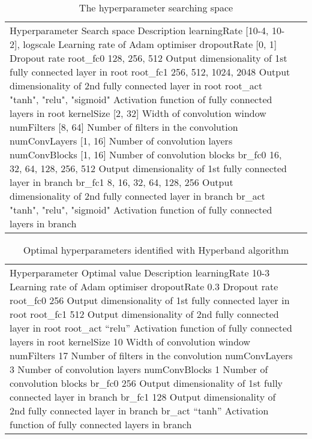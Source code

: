 \begin{table}[h]
    \centering
    \begin{tabular}{lr}
      \hline
      Hyperparameter	Search space	Description
      \hline
      learningRate	[10-4, 10-2], logscale	Learning rate of Adam optimiser
      dropoutRate	[0, 1]	Dropout rate
      root_fc0	128, 256, 512	Output dimensionality of 1st fully connected layer in root
      root_fc1	256, 512, 1024, 2048	Output dimensionality of 2nd fully connected layer in root
      root_act	"tanh", "relu", "sigmoid"	Activation function of fully connected layers in root
      kernelSize	[2, 32]	Width of convolution window
      numFilters	[8, 64]	Number of filters in the convolution
      numConvLayers	[1, 16]	Number of convolution layers
      numConvBlocks	[1, 16]	Number of convolution blocks
      br_fc0	16, 32, 64, 128, 256, 512	Output dimensionality of 1st fully connected layer in branch
      br_fc1	8, 16, 32, 64, 128, 256	Output dimensionality of 2nd fully connected layer in branch
      br_act	"tanh", "relu", "sigmoid"	Activation function of fully connected layers in branch
      \hline
    \end{tabular}
    \caption{The hyperparameter searching space}
    \label{si_table16}
\end{table}


\begin{table}[h]
    \centering
    \begin{tabular}{lr}
      \hline
      Hyperparameter	Optimal value	Description
      \hline
      learningRate	10-3	Learning rate of Adam optimiser
      dropoutRate	0.3	Dropout rate
      root_fc0	256	Output dimensionality of 1st fully connected layer in root
      root_fc1	512	Output dimensionality of 2nd fully connected layer in root
      root_act	“relu”	Activation function of fully connected layers in root
      kernelSize	10	Width of convolution window
      numFilters	17	Number of filters in the convolution
      numConvLayers	3	Number of convolution layers
      numConvBlocks	1	Number of convolution blocks
      br_fc0	256	Output dimensionality of 1st fully connected layer in branch
      br_fc1	128	Output dimensionality of 2nd fully connected layer in branch
      br_act	“tanh”	Activation function of fully connected layers in branch
      \hline
    \end{tabular}
    \caption{Optimal hyperparameters identified with Hyperband algorithm}
    \label{si_table17}
\end{table}


